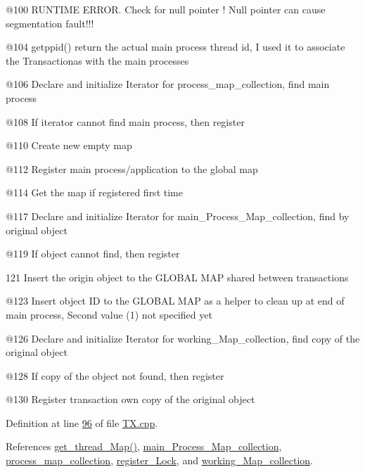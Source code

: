 @100 R\+U\+N\+T\+I\+ME E\+R\+R\+OR. Check for null pointer ! Null pointer can cause segmentation fault!!!

@104 getppid() return the actual main process thread id, I used it to associate the Transactionas with the main processes

@106 Declare and initialize Iterator for process\+\_\+map\+\_\+collection, find main process

@108 If iterator cannot find main process, then register

@110 Create new empty map

@112 Register main process/application to the global map

@114 Get the map if registered first time

@117 Declare and initialize Iterator for main\+\_\+\+Process\+\_\+\+Map\+\_\+collection, find by original object

@119 If object cannot find, then register

\textquotesingle{}121 Insert the origin object to the G\+L\+O\+B\+AL M\+AP shared between transactions

@123 Insert object ID to the G\+L\+O\+B\+AL M\+AP as a helper to clean up at end of main process, Second value (1) not specified yet

@126 Declare and initialize Iterator for working\+\_\+\+Map\+\_\+collection, find copy of the original object

@128 If copy of the object not found, then register

@130 Register transaction own copy of the original object 

Definition at line \hyperlink{_t_x_8cpp_source_l00096}{96} of file \hyperlink{_t_x_8cpp_source}{T\+X.\+cpp}.



References \hyperlink{_t_x_8cpp_source_l00301}{get\+\_\+thread\+\_\+\+Map()}, \hyperlink{_t_x_8h_source_l00105}{main\+\_\+\+Process\+\_\+\+Map\+\_\+collection}, \hyperlink{_t_x_8h_source_l00109}{process\+\_\+map\+\_\+collection}, \hyperlink{_t_x_8h_source_l00117}{register\+\_\+\+Lock}, and \hyperlink{_t_x_8h_source_l00093}{working\+\_\+\+Map\+\_\+collection}.


